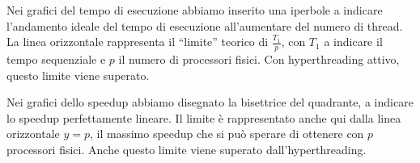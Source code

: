 \documentclass[landscape, a4paper, draft]{article}
\begin{document}
Nei grafici del tempo di esecuzione abbiamo inserito una iperbole a indicare l'andamento ideale del tempo di esecuzione all'aumentare del numero di thread.
La linea orizzontale rappresenta il ``limite'' teorico di $\frac{T_1}{p}$, con $T_1$ a indicare il tempo sequenziale e $p$ il numero di processori fisici.
Con hyperthreading attivo, questo limite viene superato.

Nei grafici dello speedup abbiamo disegnato la bisettrice del quadrante, a indicare lo speedup perfettamente lineare.
Il limite \`e rappresentato anche qui dalla linea orizzontale $y = p$, il massimo speedup che si pu\`o sperare di ottenere con $p$ processori fisici.
Anche questo limite viene superato dall'hyperthreading.

\listoffigures


\end{document}
